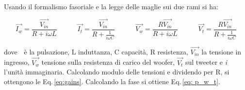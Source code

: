 \documentclass[../Relazione_circuiti]{subfiles}
\begin{document}
Usando il formalismo fasoriale e la legge delle maglie sui due rami si ha:

\begin{equation*}
  \overrightarrow{I_{w}} = \frac{\overrightarrow{V_{in}}}{R+i \omega L} \qquad \quad %
  \overrightarrow{I_{t}} = \frac{\overrightarrow{V_{in}}}{R+\frac{1}{i \omega C}} \qquad \quad %
    \overrightarrow{V_{w}} = \frac{R \overrightarrow{V_{in}}}{R+i \omega L} \qquad \quad %
  \overrightarrow{V_{t}} = \frac{R \overrightarrow{V_{in}}}{R+\frac{1}{i \omega C}}  
\end{equation*}

dove \textomega \,\ è la pulsazione, L induttanza, C capacità, R resistenza, $\overrightarrow{V_{in}}$ la tensione in
ingresso, $\overrightarrow{V_{w}}$ tensione sulla resistenza di carico del woofer, $\overrightarrow{V_{t}}$ sul tweeter
e \textit{i} l'unità immaginaria.
Calcolando modulo delle tensioni e dividendo per R, si ottengono le Eq.\,\eqref{eq:gains}.
Calcolando la fase si ottiene Eq.\,\eqref{eq: p_w_t}.
\end{document}
